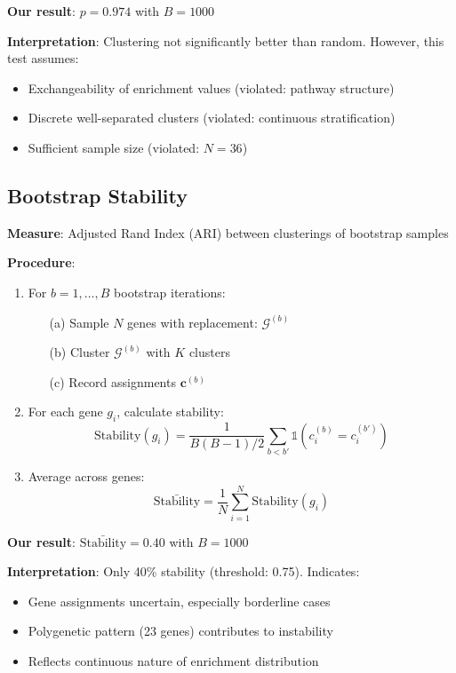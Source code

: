 \documentclass[12pt,letterpaper]{article}
\theoremstyle{definition}
\theoremstyle{remark}
\begin{document}
\textbf{Our result}: $p = 0.974$ with $B=1000$

\textbf{Interpretation}: Clustering not significantly better than random. However, this test assumes:
\begin{itemize}
    \item Exchangeability of enrichment values (violated: pathway structure)
    \item Discrete well-separated clusters (violated: continuous stratification)
    \item Sufficient sample size (violated: $N=36$)
\end{itemize}

\subsection{Bootstrap Stability}

\textbf{Measure}: Adjusted Rand Index (ARI) between clusterings of bootstrap samples

\textbf{Procedure}:
\begin{enumerate}
    \item For $b = 1, \ldots, B$ bootstrap iterations:
    \begin{itemize}
        \item[(a)] Sample $N$ genes with replacement: $\mathcal{G}^{(b)}$
        \item[(b)] Cluster $\mathcal{G}^{(b)}$ with $K$ clusters
        \item[(c)] Record assignments $\mathbf{c}^{(b)}$
    \end{itemize}
    \item For each gene $g_i$, calculate stability:
    \begin{equation}
    \text{Stability}(g_i) = \frac{1}{B(B-1)/2} \sum_{b < b'} \mathbb{1}(c_i^{(b)} = c_i^{(b')})
    \end{equation}
    \item Average across genes:
    \begin{equation}
    \bar{\text{Stability}} = \frac{1}{N} \sum_{i=1}^N \text{Stability}(g_i)
    \end{equation}
\end{enumerate}

\textbf{Our result}: $\bar{\text{Stability}} = 0.40$ with $B=1000$

\textbf{Interpretation}: Only 40\% stability (threshold: 0.75). Indicates:
\begin{itemize}
    \item Gene assignments uncertain, especially borderline cases
    \item Polygenetic pattern (23 genes) contributes to instability
    \item Reflects continuous nature of enrichment distribution
\end{itemize}
\end{document}
